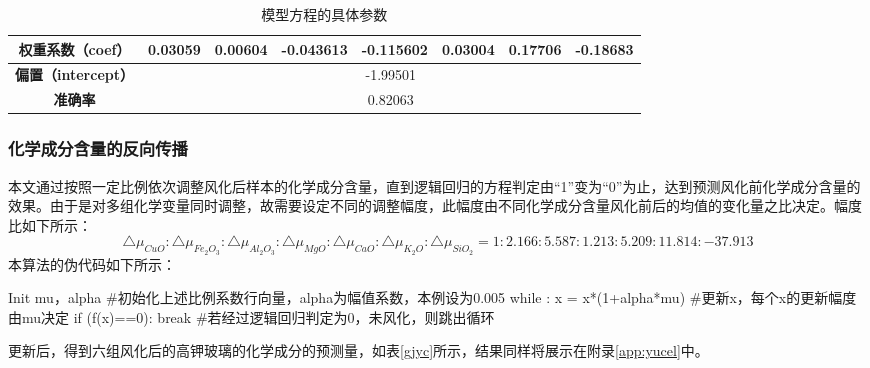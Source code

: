 \documentclass[withoutpreface,bwprint]{cumcmthesis} %
\begin{document}
\begin{itemize}
	\begin{table}[!h]
		\centering
		\caption{模型方程的具体参数}
		\label{canshu}
		\begin{tabular}{|c|ccccccc|}
			\hline
			\textbf{权重系数（coef）}    & \multicolumn{1}{c|}{0.03059} & \multicolumn{1}{c|}{0.00604} & \multicolumn{1}{c|}{-0.043613} & \multicolumn{1}{c|}{-0.115602} & \multicolumn{1}{c|}{0.03004} & \multicolumn{1}{c|}{0.17706} & -0.18683 \\ \hline
			\textbf{偏置（intercept）} & \multicolumn{7}{c|}{-1.99501}                                                                                                                                                                          \\ \hline
			\textbf{准确率}           & \multicolumn{7}{c|}{0.82063}                                                                                                                                                                           \\ \hline
		\end{tabular}
	\end{table}
	
\end{itemize}

\subsubsection{化学成分含量的反向传播}

本文通过按照一定比例依次调整风化后样本的化学成分含量，直到逻辑回归的方程判定由“1”变为“0”为止，达到预测风化前化学成分含量的效果。由于是对多组化学变量同时调整，故需要设定不同的调整幅度，此幅度由不同化学成分含量风化前后的均值的变化量之比决定。幅度比如下所示： $$\bigtriangleup \mu_{CuO}:\bigtriangleup \mu_{Fe_{2}O_{3}}:\bigtriangleup \mu_{Al_{2}O_{3}}:\bigtriangleup \mu_{MgO}:\bigtriangleup \mu_{CaO}:\bigtriangleup \mu_{K_{2}O}:\bigtriangleup \mu_{SiO_{2}}=1:2.166:5.587:1.213:5.209:11.814:-37.913$$ 本算法的伪代码如下所示：

\begin{python}
	Init mu，alpha       #初始化上述比例系数行向量，alpha为幅值系数，本例设为0.005
	while :
	x = x*(1+alpha*mu) #更新x，每个x的更新幅度由mu决定
	if (f(x)==0):
	break            #若经过逻辑回归判定为0，未风化，则跳出循环
\end{python}

更新后，得到六组风化后的高钾玻璃的化学成分的预测量，如表\ref{gjyc}所示，结果同样将展示在附录\ref{app:yucel}中。
\end{document}

